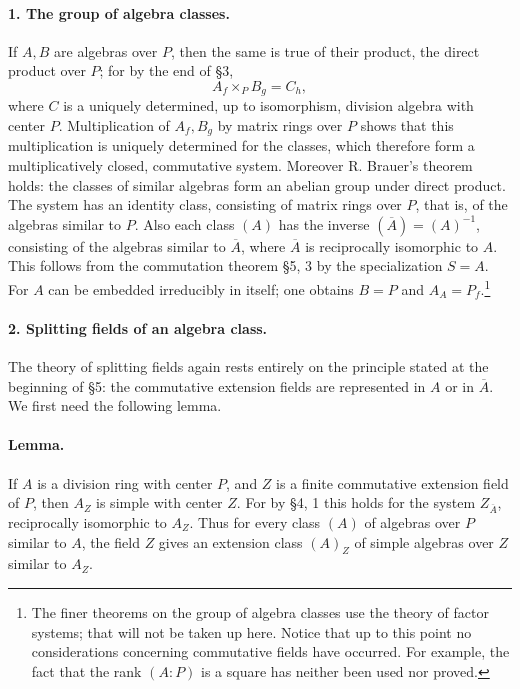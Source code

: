 \documentclass[11pt]{article}
\begin{document}
\paragraph{1. The group of algebra classes.}
If \(A,B\) are algebras over \(P\), then the same is true of their product, the direct product over \(P\); for by the end of §3,
\[
        A_f\times_P B_g=C_h,
\]
where \(C\) is a uniquely determined, up to isomorphism, division algebra with center \(P\). Multiplication of \(A_f,B_g\) by matrix rings over \(P\) shows that this multiplication is uniquely determined for the classes, which therefore form a multiplicatively closed, commutative system. Moreover R. Brauer's theorem holds: the classes of similar algebras form an abelian group under direct product. The system has an identity class, consisting of matrix rings over \(P\), that is, of the algebras similar to \(P\). Also each class \((A)\) has the inverse \((\overline A)=(A)^{-1}\), consisting of the algebras similar to \(\overline A\), where \(\overline A\) is reciprocally isomorphic to \(A\). This follows from the commutation theorem §5, 3 by the specialization \(S=A\). For \(A\) can be embedded irreducibly in itself; one obtains \(B=P\) and \(A_A=P_f\).\footnote{The finer theorems on the group of algebra classes use the theory of factor systems; that will not be taken up here. Notice that up to this point no considerations concerning commutative fields have occurred. For example, the fact that the rank \((A:P)\) is a square has neither been used nor proved.}

\paragraph{2. Splitting fields of an algebra class.}
The theory of splitting fields again rests entirely on the principle stated at the beginning of §5: the commutative extension fields are represented in \(A\) or in \(\overline A\). We first need the following lemma.

\paragraph{Lemma.}
If \(A\) is a division ring with center \(P\), and \(Z\) is a finite commutative extension field of \(P\), then \(A_Z\) is simple with center \(Z\). For by §4, 1 this holds for the system \(Z_{\overline A}\), reciprocally isomorphic to \(A_Z\). Thus for every class \((A)\) of algebras over \(P\) similar to \(A\), the field \(Z\) gives an extension class \((A)_Z\) of simple algebras over \(Z\) similar to \(A_Z\).
\end{document}
